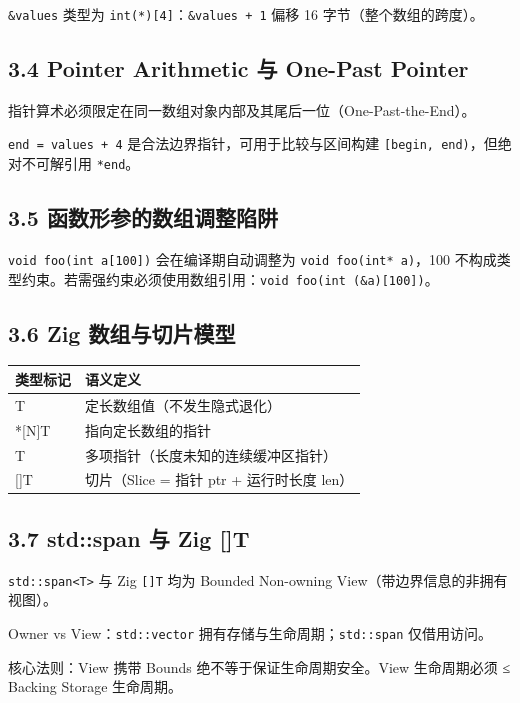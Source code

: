 \documentclass[11pt,a4paper]{article}
\begin{document}
\texttt{\&values} 类型为 \texttt{int(*)[4]}：\texttt{\&values + 1} 偏移 16 字节（整个数组的跨度）。

\subsection{3.4 Pointer Arithmetic 与 One-Past Pointer}
指针算术必须限定在同一数组对象内部及其尾后一位（One-Past-the-End）。

\texttt{end = values + 4} 是合法边界指针，可用于比较与区间构建 \texttt{[begin, end)}，但绝对不可解引用 \texttt{*end}。

\subsection{3.5 函数形参的数组调整陷阱}
\texttt{void foo(int a[100])} 会在编译期自动调整为 \texttt{void foo(int* a)}，100 不构成类型约束。若需强约束必须使用数组引用：\texttt{void foo(int (\&a)[100])}。

\subsection{3.6 Zig 数组与切片模型}
\begin{table}[htbp]
\centering
\small
\begin{tabularx}{\textwidth}{| X | X |}
\hline
\rowcolor{codebg}
\textbf{类型标记} & \textbf{语义定义} \\ \hline
[N]T & 定长数组值（不发生隐式退化） \\ \hline
\rowcolor{codebg!50} *[N]T & 指向定长数组的指针 \\ \hline
[*]T & 多项指针（长度未知的连续缓冲区指针） \\ \hline
\rowcolor{codebg!50} []T & 切片（Slice = 指针 ptr + 运行时长度 len） \\ \hline
\end{tabularx}
\end{table}
\subsection{3.7 std::span 与 Zig []T}
\texttt{std::span<T>} 与 Zig \texttt{[]T} 均为 Bounded Non-owning View（带边界信息的非拥有视图）。

Owner vs View：\texttt{std::vector} 拥有存储与生命周期；\texttt{std::span} 仅借用访问。

核心法则：View 携带 Bounds 绝不等于保证生命周期安全。View 生命周期必须 ≤ Backing Storage 生命周期。
\end{document}
